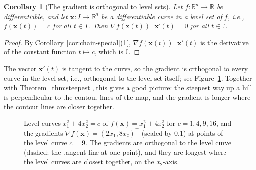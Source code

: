 \documentclass[11pt]{article}
\theoremstyle{definition}
\theoremstyle{plain}
\newtheorem{corollary}[definition]{Corollary}
\theoremstyle{remark}
\begin{document}
\begin{corollary}[The gradient is orthogonal to level sets]\label{cor:level-sets}
    Let $f: \mathbb{R}^n \to \mathbb{R}$ be differentiable, and let $\mathbf{x}: I \to \mathbb{R}^n$ be a differentiable curve in a level set of $f$, i.e., $f(\mathbf{x}(t)) = c$ for all $t \in I$. Then $\nabla f(\mathbf{x}(t))^\top \mathbf{x}'(t) = 0$ for all $t \in I$.
\end{corollary}

\begin{proof}
    By Corollary~\ref{cor:chain-special}(1), $\nabla f(\mathbf{x}(t))^\top \mathbf{x}'(t)$ is the derivative of the constant function $t \mapsto c$, which is $0$.
\end{proof}

The vector $\mathbf{x}'(t)$ is tangent to the curve, so the gradient is orthogonal to every curve in the level set, i.e., orthogonal to the level set itself; see Figure~\ref{fig:gradient-field}. Together with Theorem~\ref{thm:steepest}, this gives a good picture: the steepest way up a hill is perpendicular to the contour lines of the map, and the gradient is longer where the contour lines are closer together.

\begin{figure}[ht]
    \centering
    \caption{Level curves $x_1^2 + 4x_2^2 = c$ of $f(\mathbf{x}) = x_1^2 + 4x_2^2$ for $c = 1, 4, 9, 16$, and the gradients $\nabla f(\mathbf{x}) = (2x_1, 8x_2)^\top$ (scaled by $0.1$) at points of the level curve $c = 9$. The gradients are orthogonal to the level curve (dashed: the tangent line at one point), and they are longest where the level curves are closest together, on the $x_2$-axis.}
    \label{fig:gradient-field}
\end{figure}
\end{document}
